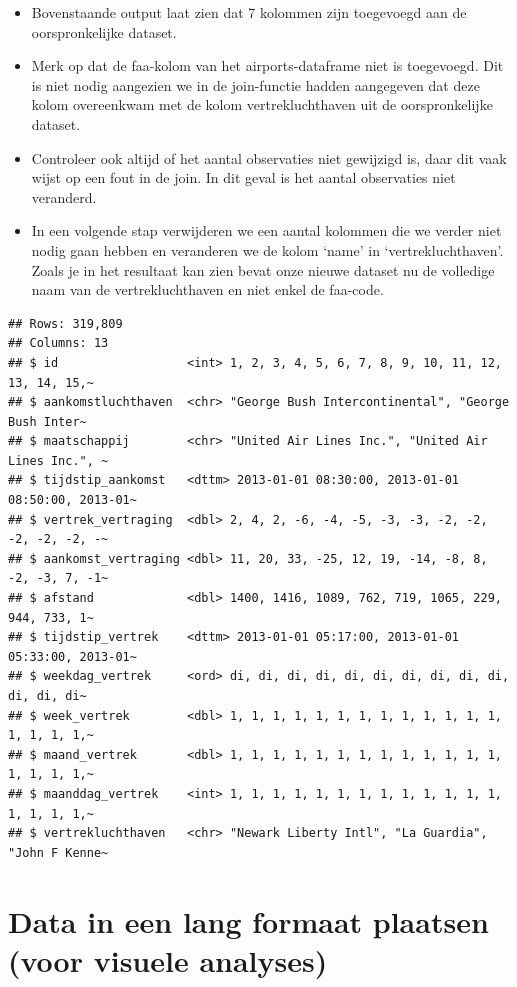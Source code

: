 \documentclass[]{tufte-book}
\providecommand{\tightlist}{%
  \setlength{\itemsep}{0pt}\setlength{\parskip}{0pt}}
\begin{document}
\begin{itemize}
\tightlist
\item
  Bovenstaande output laat zien dat 7 kolommen zijn toegevoegd aan de oorspronkelijke dataset.
\item
  Merk op dat de faa-kolom van het airports-dataframe niet is toegevoegd. Dit is niet nodig aangezien we in de join-functie hadden aangegeven dat deze kolom overeenkwam met de kolom vertrekluchthaven uit de oorspronkelijke dataset.
\item
  Controleer ook altijd of het aantal observaties niet gewijzigd is, daar dit vaak wijst op een fout in de join. In dit geval is het aantal observaties niet veranderd.
\item
  In een volgende stap verwijderen we een aantal kolommen die we verder niet nodig gaan hebben en veranderen we de kolom `name' in `vertrekluchthaven'. Zoals je in het resultaat kan zien bevat onze nieuwe dataset nu de volledige naam van de vertrekluchthaven en niet enkel de faa-code.
\end{itemize}

\begin{verbatim}
## Rows: 319,809
## Columns: 13
## $ id                  <int> 1, 2, 3, 4, 5, 6, 7, 8, 9, 10, 11, 12, 13, 14, 15,~
## $ aankomstluchthaven  <chr> "George Bush Intercontinental", "George Bush Inter~
## $ maatschappij        <chr> "United Air Lines Inc.", "United Air Lines Inc.", ~
## $ tijdstip_aankomst   <dttm> 2013-01-01 08:30:00, 2013-01-01 08:50:00, 2013-01~
## $ vertrek_vertraging  <dbl> 2, 4, 2, -6, -4, -5, -3, -3, -2, -2, -2, -2, -2, -~
## $ aankomst_vertraging <dbl> 11, 20, 33, -25, 12, 19, -14, -8, 8, -2, -3, 7, -1~
## $ afstand             <dbl> 1400, 1416, 1089, 762, 719, 1065, 229, 944, 733, 1~
## $ tijdstip_vertrek    <dttm> 2013-01-01 05:17:00, 2013-01-01 05:33:00, 2013-01~
## $ weekdag_vertrek     <ord> di, di, di, di, di, di, di, di, di, di, di, di, di~
## $ week_vertrek        <dbl> 1, 1, 1, 1, 1, 1, 1, 1, 1, 1, 1, 1, 1, 1, 1, 1, 1,~
## $ maand_vertrek       <dbl> 1, 1, 1, 1, 1, 1, 1, 1, 1, 1, 1, 1, 1, 1, 1, 1, 1,~
## $ maanddag_vertrek    <int> 1, 1, 1, 1, 1, 1, 1, 1, 1, 1, 1, 1, 1, 1, 1, 1, 1,~
## $ vertrekluchthaven   <chr> "Newark Liberty Intl", "La Guardia", "John F Kenne~
\end{verbatim}

\hypertarget{data-in-een-lang-formaat-plaatsen-voor-visuele-analyses}{%
\section{Data in een lang formaat plaatsen (voor visuele analyses)}\label{data-in-een-lang-formaat-plaatsen-voor-visuele-analyses}}
\end{document}
